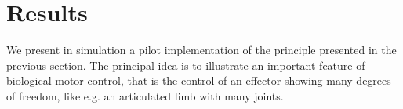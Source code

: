 \documentclass[runningheads]{llncs}
\begin{document}





\section{Results}




We present in simulation a pilot implementation of the principle presented in the previous section. The principal idea is to illustrate an important feature of biological motor control, that is the control of an effector showing many degrees of freedom, like e.g. an articulated limb with many joints. 
\end{document}
